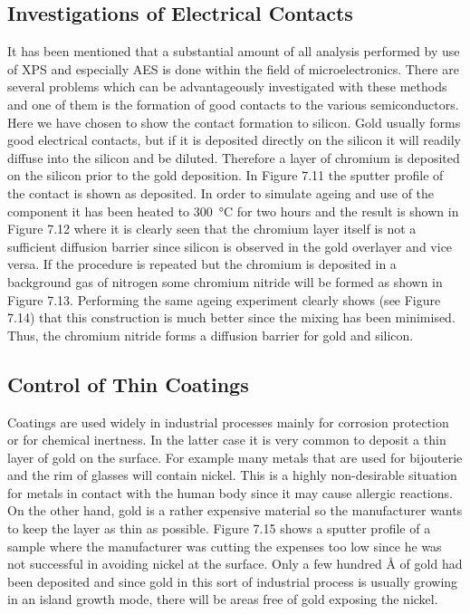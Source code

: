 \subsection{Investigations of Electrical Contacts}
It has been mentioned that a substantial amount of all analysis performed by use of XPS and especially AES is done within the field of microelectronics. There are several problems which can be advantageously investigated with these methods and one of them is the formation of good contacts to the various semiconductors. Here we have chosen to show the contact formation to silicon. Gold usually forms good electrical contacts, but if it is deposited directly on the silicon it will readily diffuse into the silicon and be diluted. Therefore a layer of chromium is deposited on the silicon prior to the gold deposition. In Figure 7.11 the sputter profile of the contact is shown as deposited. In order to simulate ageing and use of the component it has been heated to \SI{300}{\degreeCelsius} for two hours and the result is shown in Figure 7.12 where it is clearly seen that the chromium layer itself is not a sufficient diffusion barrier since silicon is observed in the gold overlayer and vice versa. If the procedure is repeated but the chromium is deposited in a background gas of nitrogen some chromium nitride will be formed as shown in Figure 7.13. Performing the same ageing experiment clearly shows (see Figure 7.14) that this construction is much better since the mixing has been minimised. Thus, the chromium nitride forms a diffusion barrier for gold and silicon.

\subsection{Control of Thin Coatings}
Coatings are used widely in industrial processes mainly for corrosion protection or for chemical inertness. In the latter case it is very common to deposit a thin layer of gold on the surface. For example many metals that are used for bijouterie and the rim of glasses will contain nickel. This is a highly non-desirable situation for metals in contact with the human body since it may cause allergic reactions. On the other hand, gold is a rather expensive material so the manufacturer wants to keep the layer as thin as possible. Figure 7.15 shows a sputter profile of a sample where the manufacturer was cutting the expenses too low since he was not successful in avoiding nickel at the surface. Only a few hundred \si{\angstrom} of gold had been deposited and since gold in this sort of industrial process is usually growing in an island growth mode, there will be areas free of gold exposing the nickel.

